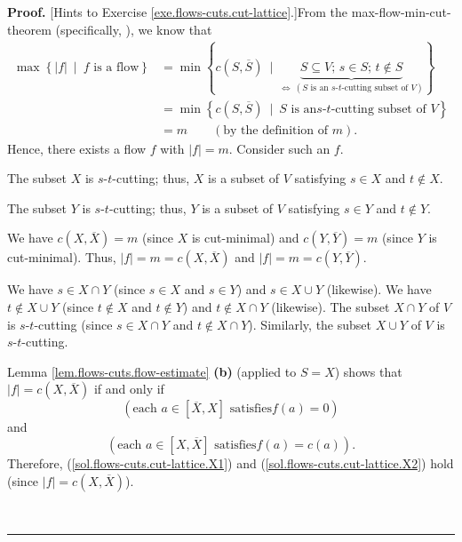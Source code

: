 \documentclass[numbers=enddot,12pt,final,onecolumn,notitlepage]{scrartcl}%
\theoremstyle{definition}
\newenvironment{proof}[1][Proof]{\noindent\textbf{#1.} }{\ \rule{0.5em}{0.5em}}
\begin{document}
\begin{proof}
[Hints to Exercise \ref{exe.flows-cuts.cut-lattice}.]From the
max-flow-min-cut-theorem (specifically, \cite[Theorem 1.10]{lec16}), we know
that%
\begin{align*}
 \max\left\{  \left\vert f\right\vert \ \mid\ f\text{ is a flow}\right\}
&  =\min\left\{  c\left(  S,\overline{S}\right)  \ \mid
\ \underbrace{S\subseteq V\text{; }s\in S\text{; }t\notin S}%
_{\Longleftrightarrow\ \left(  S\text{ is an }s\text{-}t\text{-cutting subset
of }V\right)  }\right\} \\
&  =\min\left\{  c\left(  S,\overline{S}\right)  \ \mid\ S\text{ is an
}s\text{-}t\text{-cutting subset of }V\right\} \\
&  =m\qquad \left(  \text{by the definition of }m\right)  .
\end{align*}
Hence, there exists a flow $f$ with $\left\vert f\right\vert =m$. Consider
such an $f$.

The subset $X$ is $s$-$t$-cutting; thus, $X$ is a subset of $V$ satisfying
$s\in X$ and $t\notin X$.

The subset $Y$ is $s$-$t$-cutting; thus, $Y$ is a subset of $V$ satisfying
$s\in Y$ and $t\notin Y$.

We have $c\left(  X,\overline{X}\right)  =m$ (since $X$ is cut-minimal) and
$c\left(  Y,\overline{Y}\right)  =m$ (since $Y$ is cut-minimal). Thus,
$\left\vert f\right\vert =m=c\left(  X,\overline{X}\right)  $ and $\left\vert
f\right\vert =m=c\left(  Y,\overline{Y}\right)  $.

We have $s\in X\cap Y$ (since $s\in X$ and $s\in Y$) and $s\in X\cup Y$
(likewise). We have $t\notin X\cup Y$ (since $t\notin X$ and $t\notin Y$) and
$t\notin X\cap Y$ (likewise). The subset $X\cap Y$ of $V$ is $s$-$t$-cutting
(since $s\in X\cap Y$ and $t\notin X\cap Y$). Similarly, the subset $X\cup Y$
of $V$ is $s$-$t$-cutting.

Lemma \ref{lem.flows-cuts.flow-estimate} \textbf{(b)} (applied to $S=X$) shows
that $\left\vert f\right\vert =c\left(  X,\overline{X}\right)  $ if and only
if
\begin{equation}
\left(  \text{each }a\in\left[  \overline{X},X\right]  \text{ satisfies
}f\left(  a\right)  =0\right)  \label{sol.flows-cuts.cut-lattice.X1}%
\end{equation}
and%
\begin{equation}
\left(  \text{each }a\in\left[  X,\overline{X}\right]  \text{ satisfies
}f\left(  a\right)  =c\left(  a\right)  \right)
.\label{sol.flows-cuts.cut-lattice.X2}%
\end{equation}
Therefore, (\ref{sol.flows-cuts.cut-lattice.X1}) and
(\ref{sol.flows-cuts.cut-lattice.X2}) hold (since $\left\vert f\right\vert
=c\left(  X,\overline{X}\right)  $).


\end{proof}
\end{document}
